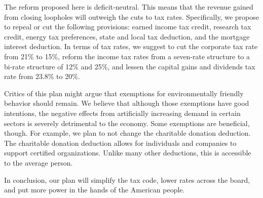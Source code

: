 \documentclass[12pt]{article}
\begin{document}
The reform proposed here is deficit-neutral. This means that the revenue gained
from closing loopholes will outweigh the cuts to tax rates. Specifically, we
propose to repeal or cut the following provisions: earned income tax credit,
research tax credit, energy tax preferences, state and local tax deduction, and
the mortgage interest deduction. In terms of tax rates, we suggest to cut the
corporate tax rate from 21\% to 15\%, reform the income tax rates from a
seven-rate structure to a bi-rate structure of 12\% and 25\%, and lessen the
capital gains and dividends tax rate from 23.8\% to 20\%.

Critics of this plan might argue that exemptions for environmentally friendly
behavior should remain. We believe that although those exemptions have good
intentions, the negative effects from artificially increasing demand in certain
sectors is severely detrimental to the economy. Some exemptions are beneficial,
though. For example, we plan to not change the charitable donation deduction.
The charitable donation deduction allows for individuals and companies to
support certified organizations. Unlike many other deductions, this is
accessible to the average person.

In conclusion, our plan will simplify the tax code, lower rates across the
board, and put more power in the hands of the American people.
\end{document}
